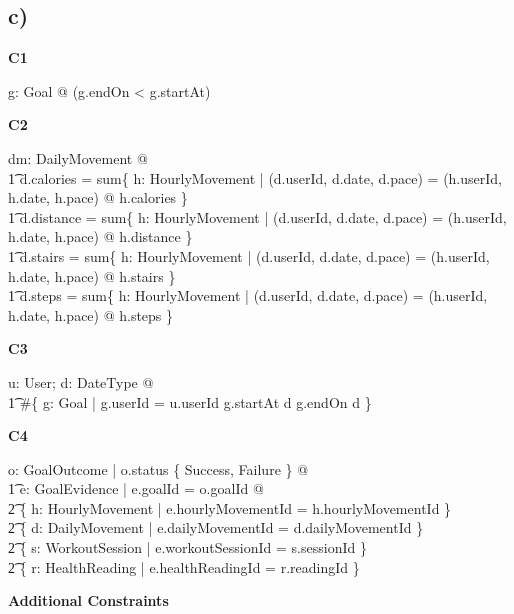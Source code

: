\documentclass{article}
\begin{document}
\subsection*{\small c)}
\textbf{\small{C1}}
\begin{zed}
\forall g: Goal @ \lnot (g.endOn < g.startAt) \\
\end{zed}
\textbf{\small{C2}}
\begin{zed}
\forall dm: DailyMovement @ \\
    \t1 d.calories = sum\{ h: HourlyMovement | (d.userId, d.date, d.pace) = (h.userId, h.date, h.pace) @ h.calories \} \\
    \t1 d.distance = sum\{ h: HourlyMovement | (d.userId, d.date, d.pace) = (h.userId, h.date, h.pace) @ h.distance \} \\
    \t1 d.stairs = sum\{ h: HourlyMovement | (d.userId, d.date, d.pace) = (h.userId, h.date, h.pace) @ h.stairs \} \\
    \t1 d.steps = sum\{ h: HourlyMovement | (d.userId, d.date, d.pace) = (h.userId, h.date, h.pace) @ h.steps \} \\
\end{zed}
\textbf{\small{C3}}
\begin{zed}
\forall u: User; d: DateType @ \\
\t1 \#\{ g: Goal | g.userId = u.userId \land g.startAt \leq d \land g.endOn \geq d \} 
\end{zed}
\textbf{\small{C4}}
\begin{zed}
\forall o: GoalOutcome | o.status \in \{ Success, Failure \} @ \\
\t1 \exists e: GoalEvidence | e.goalId = o.goalId @ \\
\t2 \{ h: HourlyMovement | e.hourlyMovementId = h.hourlyMovementId \} \neq \emptyset \lor \\
\t2 \{ d: DailyMovement | e.dailyMovementId = d.dailyMovementId \} \neq \emptyset \lor \\
\t2 \{ s: WorkoutSession | e.workoutSessionId = s.sessionId \} \neq \emptyset \lor \\
\t2 \{ r: HealthReading | e.healthReadingId = r.readingId \} \neq \emptyset \lor \\
\end{zed}
\textbf{\small{Additional Constraints}}
\end{document}
